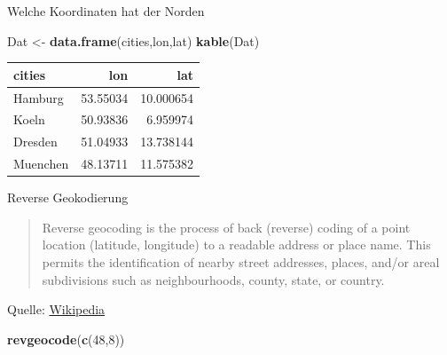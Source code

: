 \documentclass[ignorenonframetext,]{beamer}
\newenvironment{Shaded}{\begin{snugshade}}{\end{snugshade}}
\newcommand{\DecValTok}[1]{\textcolor[rgb]{0.27,0.67,0.26}{#1}}
\newcommand{\KeywordTok}[1]{\textcolor[rgb]{0.26,0.66,0.93}{\textbf{#1}}}
\newcommand{\NormalTok}[1]{\textcolor[rgb]{0.74,0.68,0.62}{#1}}
\newcommand{\StringTok}[1]{\textcolor[rgb]{0.02,0.61,0.04}{#1}}
\begin{document}
\begin{frame}[fragile]{Welche Koordinaten hat der Norden}
\protect\hypertarget{welche-koordinaten-hat-der-norden}{}

\begin{Shaded}
\begin{Highlighting}[]
\NormalTok{Dat <-}\StringTok{ }\KeywordTok{data.frame}\NormalTok{(cities,lon,lat)}
\KeywordTok{kable}\NormalTok{(Dat)}
\end{Highlighting}
\end{Shaded}

\begin{longtable}[]{@{}lrr@{}}
\toprule
cities & lon & lat\tabularnewline
\midrule
\endhead
Hamburg & 53.55034 & 10.000654\tabularnewline
Koeln & 50.93836 & 6.959974\tabularnewline
Dresden & 51.04933 & 13.738144\tabularnewline
Muenchen & 48.13711 & 11.575382\tabularnewline
\bottomrule
\end{longtable}

\end{frame}

\begin{frame}[fragile]{Reverse Geokodierung}
\protect\hypertarget{reverse-geokodierung}{}

\begin{quote}
Reverse geocoding is the process of back (reverse) coding of a point
location (latitude, longitude) to a readable address or place name. This
permits the identification of nearby street addresses, places, and/or
areal subdivisions such as neighbourhoods, county, state, or country.
\end{quote}

Quelle:
\href{https://en.wikipedia.org/wiki/Reverse_geocoding}{Wikipedia}

\begin{Shaded}
\begin{Highlighting}[]
\KeywordTok{revgeocode}\NormalTok{(}\KeywordTok{c}\NormalTok{(}\DecValTok{48}\NormalTok{,}\DecValTok{8}\NormalTok{))}
\end{Highlighting}
\end{Shaded}

\end{frame}
\end{document}
